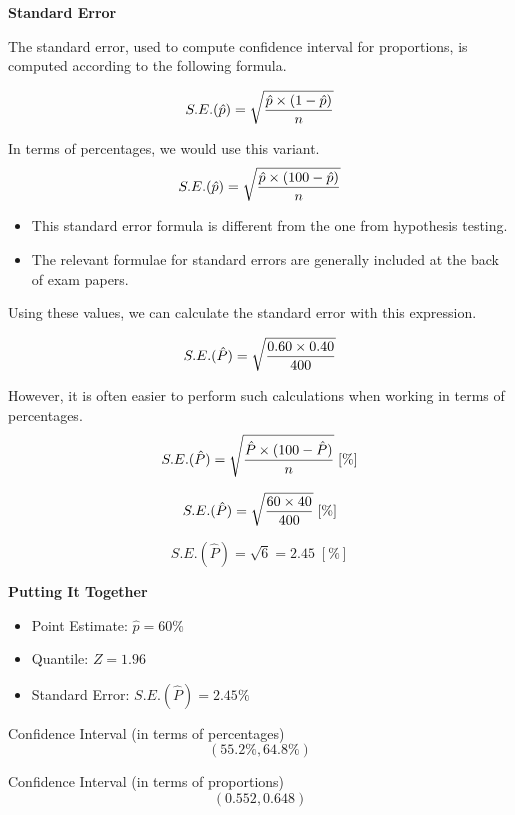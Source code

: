 \documentclass[a4paper,12pt]{article}
\begin{document}

\newpage 
\noindent \textbf{Standard Error}

\noindent The standard error, used to compute confidence interval for proportions, is computed according to the following formula.



\[
S.E. (\hat{p}) = \sqrt{ { \hat{p} \times ( 1 - \hat{p}) \over n}}
\]

\noindent In terms of percentages, we would use this variant.
\[
S.E. (\hat{p}) = \sqrt{ { \hat{p} \times ( 100 - \hat{p}) \over n}}
\]


\begin{itemize}
	\item This standard error formula is different from the one from hypothesis testing.
	\item The relevant formulae for standard errors are generally included at the back of exam papers.
\end{itemize}




\noindent Using these values, we can calculate the standard error with this expression.


\[
S.E. (\hat{P}) = \sqrt{ { 0.60 \times 0.40 \over 400}}
\]




\noindent However, it is often easier to perform such calculations when working in terms of percentages.
\vspace{0.1cm}
\[
S.E. (\hat{P}) = \sqrt{ { \hat{P} \times ( 100 - \hat{P}) \over n}}
\;[\%] \]

\[
S.E. (\hat{P}) = \sqrt{ { 60 \times 40 \over 400}}  \;[\%]
\]

\[
S.E. (\hat{P}) = \sqrt{ 6 } = 2.45  \;[\%]
\]



\newpage 
\noindent	\textbf{Putting It Together}
\begin{itemize}
	\item Point Estimate:  $\hat{p} = 60\% $
	\vspace{0.2cm}
	\item Quantile: $Z = 1.96 $
	\vspace{0.2cm}
	\item Standard Error:
	$S.E. (\hat{P}) = 2.45 \% $
\end{itemize}
\vspace{0.5cm}

\noindent Confidence Interval (in terms of percentages)
\[  (55.2\%, 64.8 \%)\]

\noindent Confidence Interval (in terms of proportions)
\[  (0.552, 0.648)\]
\end{document}
